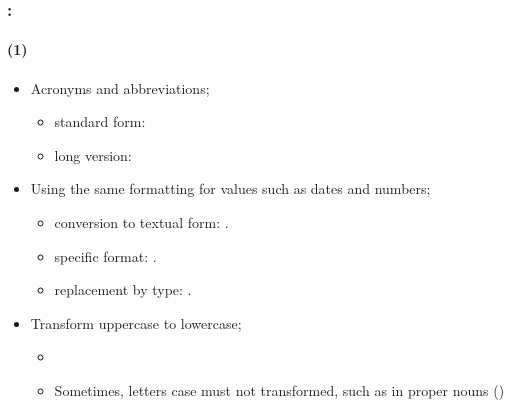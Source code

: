 \documentclass[xcolor=table]{beamer}
\begin{document}
\begin{frame}
	\frametitle{\insertshortsubtitle: \insertsection}
	\framesubtitle{\insertsubsection (1)}

	\begin{itemize}
		\item Acronyms and abbreviations;
		\begin{itemize}
			\item standard form: 
			\item long version: 
		\end{itemize}
		
		\item Using the same formatting for values such as dates and numbers;
		\begin{itemize}
			\item conversion to textual form: .
			\item specific format: .
			\item replacement by type: .
		\end{itemize}
		
		\item Transform uppercase to lowercase;
		\begin{itemize}
			\item {}
			\item Sometimes, letters case must not transformed, such as in proper nouns ()
		\end{itemize}
	\end{itemize}

\end{frame}
\end{document}
